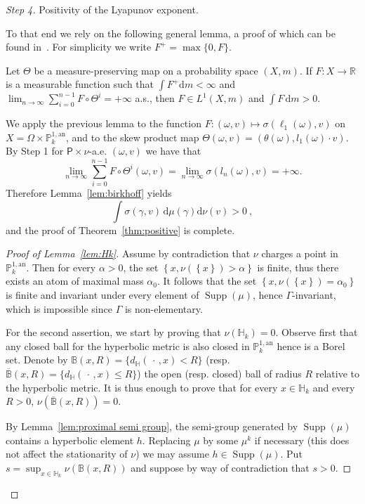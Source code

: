 \documentclass[AHL,Unicode,longabstracts]{cedram}
\DeclareMathOperator{\supp}{Supp}
\newcommand{\re}{\mathbb{R}}
\newcommand{\hh}{\mathbb{H}}
\newcommand{\prob}{\mathsf{P}}
\newcommand{\B}{\mathbb{B}}
\newcommand{\an}{\mathrm{an}}
\newcommand{\cv}{\rightarrow}
\newcommand{\om}{\Omega}
\newcommand{\set}[1]{\left\{#1\right\}}
\newcommand{\PP}{\mathbb{P}}
\newcommand{\berk}{{\mathbb{P}^{1, \mathrm{an}}_k}}
\newcommand*{\dd}{\mathrm{d}}
\newcommand*{\dm}{\dd m}
\newcommand*{\dmu}{\dd \mu}
\newcommand*{\dnu}{\dd \nu}
\newenvironment{step}{\begin{proof}}{\let\qed\relax \end{proof}}
\begin{document}
\begin{step}[Step 4]
Positivity of the Lyapunov exponent.

To that end we rely on the following general lemma, a proof of which can be found in~\cite[Lem.~2.3, p.~22]{bougerol-lacroix}. For simplicity we write $F^+ = \max \{ 0, F\}$.

\begin{lemm}\label{lem:birkhoff}
Let $\Theta$ be a measure-preserving map on a probability space $(X, m)$. If $F:X\to \re$ is a measurable function such that $\int F^+ \dm <\infty$ and $\lim_{n\cv\infty} \sum_{i=0}^{n-1} F\circ \Theta^i = +\infty $ a.s., then $F\in L^1(X,m)$ and $\int F \,\dm >0$.
\end{lemm}

We apply the previous lemma to the function $F: (\omega, v) \mapsto \sigma(\ell_1(\omega), v)$ on $X=\om\times \berk$, and to the skew product map $\Theta(\omega,v) = (\theta(\omega), l_1(\omega) \cdot v)$. By Step 1 for $\prob\times \nu$-a.e. $(\omega,v)$ we have that
\[
\lim_{n\cv\infty} \sum_{i=0}^{n-1} F\circ \Theta^i (\omega,v) = \lim_{n\cv\infty} \sigma(l_n(\omega),v) = +\infty.
\]
Therefore Lemma~\ref{lem:birkhoff} yields
\begin{equation}\label{eqL}
\int \sigma(\gamma, v)\, \dmu(\gamma)\dnu(v) >0~,
\end{equation}
and the proof of Theorem~\ref{thm:positive} is complete.

\begin{proof}[Proof of Lemma~\ref{lem:Hk}]
Assume by contradiction that $\nu$ charges a point in $\PP^{1,\an}_k$. Then for every $\alpha>0$, the set $\set{x, \nu(\set{x})>\alpha}$ is finite, thus there exists an atom of maximal mass $\alpha_0$. It follows that the set $\set {x, \nu(\set{x})=\alpha_0}$ is finite and invariant under every element of $\supp(\mu)$, hence $\Gamma$-invariant, which is impossible since $\Gamma$ is non-elementary.

For the second assertion, we start by proving that $\nu(\hh_k) =0$. Observe first that any closed ball for the hyperbolic metric is also closed in $\PP^{1,\an}_k$ hence is a Borel set. Denote by $\B(x,R) = \{ d_{\hh}({\,\cdot\,}, x) < R\}$ (resp. $\overline{\B}(x,R) = \{ d_{\hh}({\,\cdot\,}, x) \le R\}$) the open (resp. closed) ball of radius $R$ relative to the hyperbolic metric. It is thus enough to prove that for every $x\in \hh_k$ and every $R>0$, $\nu(\overline{\B}(x,R)) = 0$.

By Lemma~\ref{lem:proximal semi group}, the semi-group generated by $\supp(\mu)$ contains a hyperbolic element $h$. Replacing $\mu$ by some $\mu^k$ if necessary (this does not affect the stationarity of $\nu$) we may assume $h\in \supp(\mu)$. Put $s= \sup_{x\in \hh_k} \nu(\B(x,R))$ and suppose by way of contradiction that $s>0$.


\end{proof}
\end{step}
\end{document}
